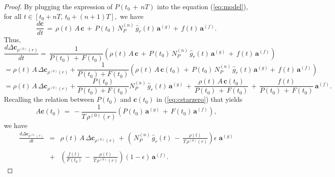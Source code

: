\begin{proof}
\noindent By plugging the expression of $P(t_0\,+\,n T)$ into the
equation (\ref{eq:model}), for all $t\in[t_0+nT,\,t_0+(n+1)T],$ we have 
$$
 \displaystyle \frac{d  \mathbf{c}}{dt}
\,=\, 
\rho(t)\,  A \, \mathbf{c}\, +\, P(t_0)\, N_P^{(n)}\,\hat g_r(t) \, \mathbf{a}^{(g)} +\,   f(t) \, \mathbf{a}^{(f)}.
$$
Thus,
$$\displaystyle \frac{d \Delta \mathbf{c}_{\rho^{(0)}(r)}}{dt}  =\, \frac{1}{P(t_0)\,+\, F(t_0)} \left(\rho(t)\,  A \, \mathbf{c}\,  +\, P(t_0)\, N_P^{(n)}\,\hat g_r(t) \, \mathbf{a}^{(g)}\, +\,   f(t) \, \mathbf{a}^{(f)} \right) $$
$$=\rho(t) \, A \,\Delta \mathbf{c}_{\rho^{(0)}(r)}+
\frac{1}{P(t_0)+F(t_0)} \left( \rho(t)\,  A \, \mathbf{c}(t_0)\, +\, P(t_0)\,  N_P^{(n)}\,\hat g_r(t) \, \mathbf{a}^{(g)} +\,   f(t) \, \mathbf{a}^{(f)} \right) $$
$$=\rho(t) \, A \,\Delta \mathbf{c}_{\rho^{(0)}(r)}+
   \frac{P(t_0)}{P(t_0)+F(t_0)} N_P^{(n)}\,\hat g_r(t) \, \mathbf{a}^{(g)} \,+\, \frac{\rho(t)\,  A \, \mathbf{c}(t_0)}{P(t_0)\,+\, F(t_0)} \,+\, \displaystyle \frac{f(t)}{P(t_0)\,+\, F(t_0)}\, \mathbf{a}^{(f)} .
$$
Recalling the relation between $P(t_0)$ and  $\mathbf{c}(t_0)$ in   (\ref{eq:cstarzero}) that yields   
$$
A \mathbf{c}(t_0)\, =\, \displaystyle -\frac{1}{T\,\rho^{(0)}(r)} \left( P(t_0)\, \mathbf{a}^{(g)}\,+\, F(t_0)\, \mathbf{a}^{(f)}\right),  
$$
 we have
$$
\begin{array}{rcl}
 \displaystyle \frac{d \Delta \mathbf{c}_{\rho^{(0)}(r)}}{dt}   & =& \rho(t) \, A\, \Delta \mathbf{c}_{\rho^{(0)}(r)}\, +\, \left(  \, N_P^{(n)} \, \hat g_r(t) \,-\, \displaystyle \frac{ \rho(t)}{T\, \rho^{(0)}(r)}  \right) \epsilon\,  \, \mathbf{a}^{(g)} \\\\
    &+ & \left( \displaystyle \frac{f(t)}{F(t_0)}  \,-\,  \displaystyle \frac{\rho(t) }{T\, \rho^{(0)}(r)} \right) (1-\epsilon)\, \mathbf{a}^{(f)}.
\end{array}
$$
\end{proof}


